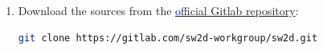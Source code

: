 \begin{enumerate}

    \item Download the sources from the \href{https://gitlab.com/sw2d-workgroup/sw2d}{\textcolor{blue}official \swdd Gitlab repository}:
    \begin{lstlisting}[language=bash]
        git clone https://gitlab.com/sw2d-workgroup/sw2d.git
    \end{lstlisting}
    

\end{enumerate}
